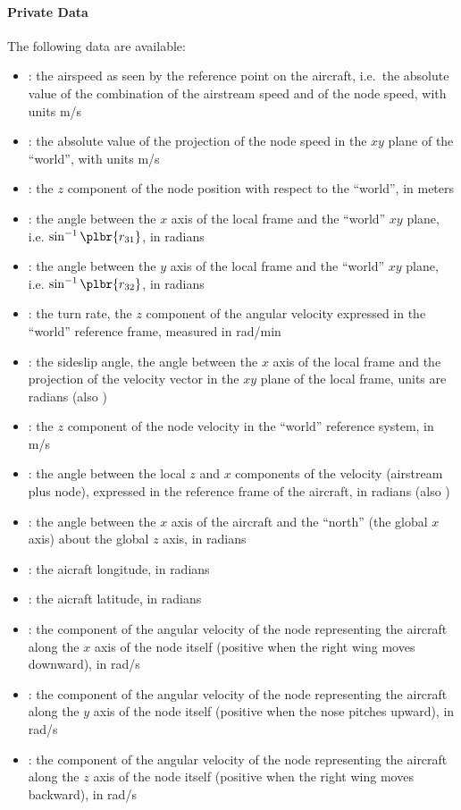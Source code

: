 \paragraph{Private Data}
The following data are available:
\begin{itemize}
\item {}: the airspeed as seen by the reference
	point on the aircraft, i.e.\ the absolute value
	of the combination of the airstream speed and of the node speed,
  with units m/s
\item {}: the absolute value of the projection
	of the node speed in the $xy$ plane of the ``world'', with units m/s
\item {}: the $z$ component of the node position
	with respect to the ``world'', in meters
\item {}: the angle between the $x$ axis of the local
  frame and the ``world'' $xy$ plane,  i.e. $\sin^{-1}\plbr{r_{31}}$,
  in radians
\item {}: the angle between the $y$ axis of the local
	frame and the ``world'' $xy$ plane, i.e. $\sin^{-1}\plbr{r_{32}}$,
  in radians
\item {}: the turn rate, the $z$ component of the angular
  velocity expressed in the ``world'' reference frame, measured in rad/min
\item {}: the sideslip angle, the angle between the $x$ axis of
  the local frame and the projection of the velocity vector in the $xy$
  plane of the local frame, units are radians (also )
\item {}: the $z$ component of the node velocity
	in the ``world'' reference system, in m/s
\item {}: the angle between the local $z$ and $x$ components
	of the velocity (airstream plus node), expressed in the reference frame
  of the aircraft, in radians (also )
\item {}: the angle between the $x$ axis of the aircraft
	and the ``north'' (the global $x$ axis) about the global $z$ axis,
  in radians
\item {}: the aicraft longitude, in radians
\item {}: the aicraft latitude, in radians
\item {}: the component of the angular velocity
	of the node representing the aircraft along the $x$ axis
	of the node itself (positive when the right wing moves downward),
  in rad/s
\item {}: the component of the angular velocity
	of the node representing the aircraft along the $y$ axis
	of the node itself (positive when the nose pitches upward),
  in rad/s
\item {}: the component of the angular velocity
	of the node representing the aircraft along the $z$ axis
	of the node itself (positive when the right wing moves backward),
  in rad/s
\end{itemize}
